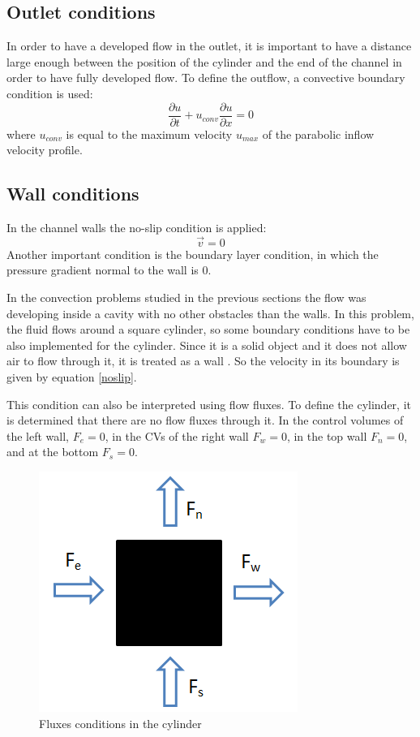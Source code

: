 \subsection{Outlet conditions}
In order to have a developed flow in the outlet, it is important to have a distance large enough between the position of the cylinder and the end of the channel in order to have fully developed flow. To define the outflow, a convective boundary condition is used:
\begin{equation}
\frac{\partial u}{\partial t}+u_{conv}\frac{\partial u}{\partial x}=0
\end{equation}
where $u_{conv}$ is equal to the maximum velocity $u_{max}$ of the parabolic inflow velocity profile.

\subsection{Wall conditions}
In the channel walls the no-slip condition is applied:
\begin{equation}
\vec{v}=0
\label{noslip}
\end{equation}
Another important condition is the boundary layer condition, in which the pressure gradient normal to the wall is 0.

In the convection problems studied in the previous sections the flow was developing inside a cavity with no other obstacles than the walls. In this problem, the fluid flows around a square cylinder, so some boundary conditions have to be also implemented for the cylinder. Since it is a solid object and it does not allow air to flow through it, it is treated as a wall \cite{Ferziger2002}. So the velocity in its boundary is given by equation \ref{noslip}.

This condition can also be interpreted using flow fluxes. To define the cylinder, it is determined that there are no flow fluxes through it. In the control volumes of the left wall, $F_{e}=0$, in the CVs of the right wall $F_{w}=0$, in the top wall $F_{n}=0$, and at the bottom $F_{s}=0$.
\begin{figure}[h]
	\centering
	\includegraphics[scale=0.6]{Square/Fluxes}
	\caption{Fluxes conditions in the cylinder}
	\label{FluxesCondCylinder}
\end{figure}
